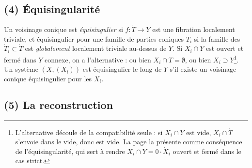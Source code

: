 \documentclass[11pt,a4paper]{article}
\begin{document}
\subsection*{(4) Équisingularité}

Un voisinage conique est \emph{équisingulier} si $f : \dot T \to Y$ est une
fibration localement triviale, et équisingulier pour une famille de parties
coniques $T_i$ si la famille des $\dot T_i \subset \dot T$ est \emph{globalement}
localement triviale au-dessus de $Y$. Si $X_i \cap Y$ est ouvert et fermé dans $Y$
connexe, on a l'alternative : ou bien $X_i \cap T = \emptyset$, ou bien $X_i
\supset Y$\footnote{L'alternative découle de la compatibilité seule : si $X_i \cap
Y$ est vide, $X_i \cap \dot T$ s'envoie dans le vide, donc est vide. La page la
présente comme conséquence de l'équisingularité, qui sert à rendre $X_i \cap Y =
0 \cdot \dot X_i$ ouvert et fermé dans le cas strict.}. Un système $(X, (X_i))$ est
équisingulier le long de $Y$ s'il existe un voisinage conique équisingulier pour
les $X_i$.

\subsection*{(5) La reconstruction}
\end{document}
